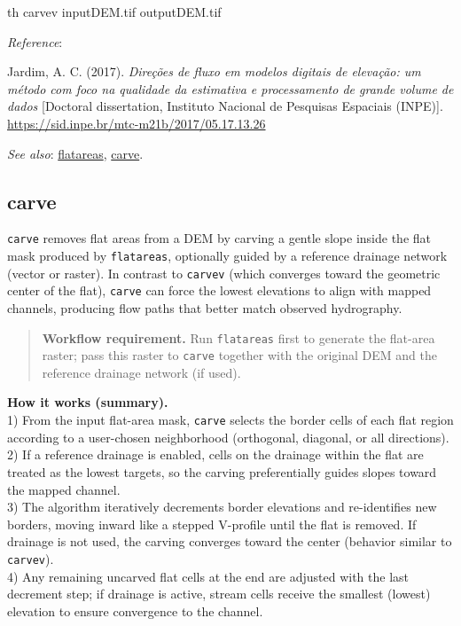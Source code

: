 \documentclass[
]{book}
\newenvironment{Shaded}{\begin{snugshade}}{\end{snugshade}}
\newcommand{\ExtensionTok}[1]{#1}
\newcommand{\NormalTok}[1]{#1}
\begin{document}
\begin{Shaded}
\begin{Highlighting}[]
\ExtensionTok{th}\NormalTok{ carvev inputDEM.tif outputDEM.tif}
\end{Highlighting}
\end{Shaded}

\emph{Reference}:

Jardim, A. C. (2017). \emph{Direções de fluxo em modelos digitais de elevação: um método com foco na qualidade da estimativa e processamento de grande volume de dados} {[}Doctoral dissertation, Instituto Nacional de Pesquisas Espaciais (INPE){]}. \href{http://mtc-m21b.sid.inpe.br/col/sid.inpe.br/mtc-m21b/2017/05.17.13.26/doc/publicacao.pdf?metadatarepository=sid.inpe.br/mtc-m21b/2017/05.17.13.26.57&mirror=sid.inpe.br/mtc-m21b/2013/09.26.14.25.22&languagebutton=en}{https://sid.inpe.br/mtc-m21b/2017/05.17.13.26}

\emph{See also}: \hyperref[flatareas]{flatareas}, \hyperref[carve]{carve}.

\subsection{carve}\label{carve}

\texttt{carve} removes flat areas from a DEM by carving a gentle slope inside the flat mask produced by \texttt{flatareas}, optionally guided by a reference drainage network (vector or raster). In contrast to \texttt{carvev} (which converges toward the geometric center of the flat), \texttt{carve} can force the lowest elevations to align with mapped channels, producing flow paths that better match observed hydrography.

\begin{quote}
\textbf{Workflow requirement.} Run \texttt{flatareas} first to generate the flat-area raster; pass this raster to \texttt{carve} together with the original DEM and the reference drainage network (if used).
\end{quote}

\textbf{How it works (summary).}\\
1) From the input flat-area mask, \texttt{carve} selects the border cells of each flat region according to a user-chosen neighborhood (orthogonal, diagonal, or all directions).\\
2) If a reference drainage is enabled, cells on the drainage within the flat are treated as the lowest targets, so the carving preferentially guides slopes toward the mapped channel.\\
3) The algorithm iteratively decrements border elevations and re-identifies new borders, moving inward like a stepped V-profile until the flat is removed. If drainage is not used, the carving converges toward the center (behavior similar to \texttt{carvev}).\\
4) Any remaining uncarved flat cells at the end are adjusted with the last decrement step; if drainage is active, stream cells receive the smallest (lowest) elevation to ensure convergence to the channel.
\end{document}
